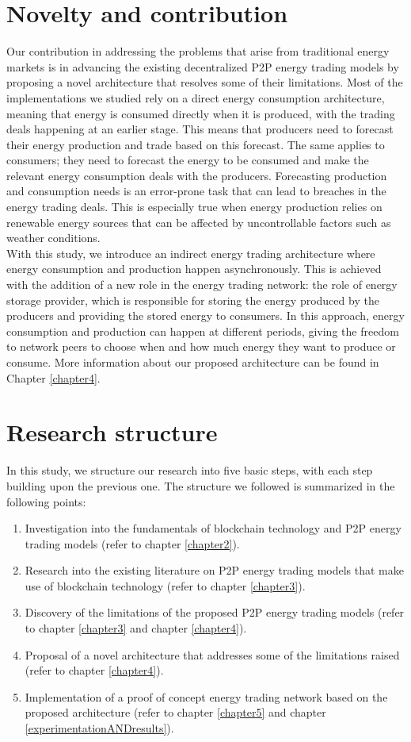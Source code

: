 \section{Novelty and contribution}
Our contribution in addressing the problems that arise from traditional energy markets is in advancing the existing decentralized P2P energy trading models by proposing a novel architecture that resolves some of their limitations. 
Most of the implementations we studied rely on a direct energy consumption architecture, meaning that energy is consumed directly when it is produced, with the trading deals happening at an earlier stage. This means that producers need 
to forecast their energy production and trade based on this forecast. The same applies to consumers; they need to forecast the energy to be consumed and make the relevant energy consumption deals with the producers. Forecasting production 
and consumption needs is an error-prone task that can lead to breaches in the energy trading deals. This is especially true when energy production relies on renewable energy sources that can be affected by uncontrollable factors such as weather 
conditions.\\ 
With this study, we introduce an indirect energy trading architecture where energy consumption and production happen asynchronously. This is achieved with the addition of a new role in the energy trading network: the role of energy storage provider, 
which is responsible for storing the energy produced by the producers and providing the stored energy to consumers. In this approach, energy consumption and production can happen at different periods, giving the freedom to network peers to choose when and 
how much energy they want to produce or consume. More information about our proposed architecture can be found in Chapter \ref{chapter4}.

\section{Research structure}
In this study, we structure our research into five basic steps, with each step building upon the previous one. The structure we followed is summarized in the following points:
\begin{enumerate}
    \item Investigation into the fundamentals of blockchain technology and P2P energy trading models (refer to chapter \ref{chapter2}).
    \item Research into the existing literature on P2P energy trading models that make use of blockchain technology (refer to chapter \ref{chapter3}).
    \item Discovery of the limitations of the proposed P2P energy trading models (refer to chapter \ref{chapter3} and chapter \ref{chapter4}).
    \item Proposal of a novel architecture that addresses some of the limitations raised (refer to chapter \ref{chapter4}).
    \item Implementation of a proof of concept energy trading network based on the proposed architecture (refer to chapter \ref{chapter5} and chapter \ref{experimentationANDresults}).
\end{enumerate}